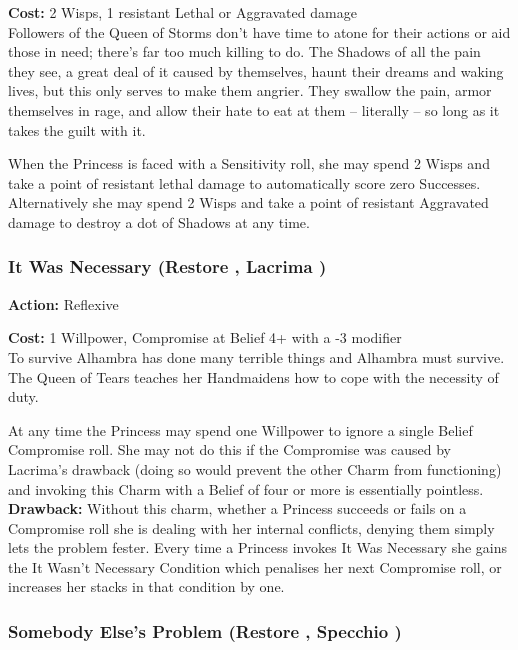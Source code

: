 \noindent \textbf{Cost:} 2 Wisps, 1 resistant Lethal or Aggravated damage \\

\noindent Followers of the Queen of Storms don't have time to atone for their actions or aid those in need; there's far too much killing to do. The Shadows of all the pain they see, a great deal of it caused by themselves, haunt their dreams and waking lives, but this only serves to make them angrier. They swallow the pain, armor themselves in rage, and allow their hate to eat at them -- literally -- so long as it takes the guilt with it.

When the Princess is faced with a Sensitivity roll, she may spend 2 Wisps and take a point of resistant lethal damage to automatically score zero Successes. Alternatively she may spend 2 Wisps and take a point of resistant Aggravated damage to destroy a dot of Shadows at any time.

\subsubsection*{It Was Necessary (Restore \textbullet\textbullet\textbullet, Lacrima \textbullet\textbullet\textbullet\textbullet)}

\noindent \textbf{Action:} Reflexive

\noindent \textbf{Cost:} 1 Willpower, Compromise at Belief 4+ with a -3 modifier\\

\noindent To survive Alhambra has done many terrible things and Alhambra must survive. The Queen of Tears teaches her Handmaidens how to cope with the necessity of duty. 

At any time the Princess may spend one Willpower to ignore a single Belief Compromise roll. She may not do this if the Compromise was caused by Lacrima's drawback (doing so would prevent the other Charm from functioning) and invoking this Charm with a Belief of four or more is essentially pointless.\\

\noindent \textbf{Drawback:} Without this charm, whether a Princess succeeds or fails on a Compromise roll she is dealing with her internal conflicts, denying them simply lets the problem fester. Every time a Princess invokes It Was Necessary she gains the It Wasn't Necessary Condition which penalises her next Compromise roll, or increases her stacks in that condition by one. 

\subsubsection*{Somebody Else's Problem (Restore \textbullet\textbullet\textbullet, Specchio \textbullet\textbullet)}


